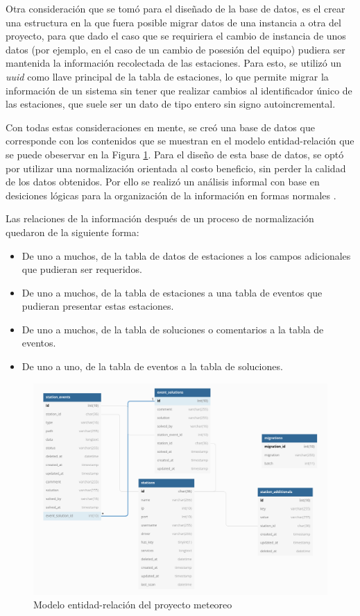 Otra consideración que se tomó para el diseñado de la base de datos, es el crear una estructura en la que fuera posible migrar datos de una instancia a otra del proyecto, para que dado el caso que se requiriera el cambio de instancia de unos datos (por ejemplo, en el caso de un cambio de posesión del equipo) pudiera ser mantenida la información recolectada de las estaciones. Para esto, se utilizó un \textit{uuid} como llave principal de la tabla de estaciones, lo que permite migrar la información de un sistema sin tener que realizar cambios al identificador único de las estaciones, que suele ser un dato de tipo entero sin signo autoincremental.

Con todas estas consideraciones en mente, se creó una base de datos que corresponde con los contenidos que se muestran en el modelo entidad-relación que se puede obeservar en la Figura \ref{fig:diagrama_base_de_datos}. Para el diseño de esta base de datos, se optó por utilizar una normalización orientada al costo beneficio, sin perder la calidad de los datos obtenidos. Por ello se realizó un análisis informal con base en desiciones lógicas para la organización de la información en formas normales \cite{justifying_normalization_lee}.

Las relaciones de la información después de un proceso de normalización quedaron de la siguiente forma:

\begin{itemize}
   \item De uno a muchos, de la tabla de datos de estaciones a los campos adicionales que pudieran ser requeridos.
   \item De uno a muchos, de la tabla de estaciones a una tabla de eventos que pudieran presentar estas estaciones.
   \item De uno a muchos, de la tabla de soluciones o comentarios a la tabla de eventos.
   \item De uno a uno, de la tabla de eventos a la tabla de soluciones.
\end{itemize}

\begin{figure}[!ht]
	\centering
	\includegraphics[width=1\linewidth]{images/diagrams/database_diagram.png}
	\caption{Modelo entidad-relación del proyecto meteoreo}
	\label{fig:diagrama_base_de_datos}
\end{figure}

